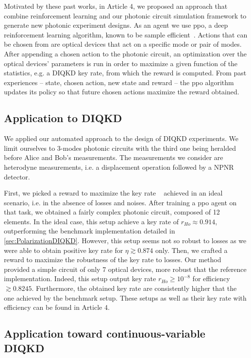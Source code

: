 Motivated by these past works, in Article 4, we proposed an approach that combine reinforcement learning and our photonic circuit simulation framework to generate new photonic experiment designs.
As an agent we use \acrfull{ppo}, a deep reinforcement learning algorithm, known to be sample efficient~\cite{Schulman2017}.
Actions that can be chosen from are optical devices that act on a specific mode or pair of modes.
After appending a chosen action to the photonic circuit, an optimization over the optical devices' parameters is run in order to maximize a given function of the statistics, e.g. a DIQKD key rate, from which the reward is computed.
From past experiences -- state, chosen action, new state and reward -- the \acrshort{ppo} algorithm updates its policy so that future chosen actions maximize the reward obtained.


\subsection{Application to DIQKD}

We applied our automated approach to the design of DIQKD experiments.
We limit ourselves to 3-modes photonic circuits with the third one being heralded before Alice and Bob's measurements.
The measurements we consider are heterodyne measurements, i.e. a displacement operation followed by a NPNR detector.

First, we picked a reward to maximize the key rate ~ achieved in an ideal scenario, i.e. in the absence of losses and noises.
After training a \acrshort{ppo} agent on that task, we obtained a fairly complex photonic circuit, composed of 12 elements.
In the ideal case, this setup achieve a key rate of $r_{Ho}\approx 0.914$, outperforming the benchmark implementation detailed in \ref{sec:PolarizationDIQKD}.
However, this setup seems not so robust to losses as we were able to obtain positive key rate for $\eta \apprge 0.874$ only.
Then, we crafted a reward to maximize the robustness of the key rate to losses.
Our method provided a simple circuit of only 7 optical devices, more robust that the reference implementation.
Indeed, this setup output key rate $r_{Ho}\geq10^{-8}$ for efficiency $\apprge 0.8245$. 
Furthermore, the obtained key rate are consistently higher that the one achieved by the benchmark setup.
These setups as well as their key rate with efficiency can be found in Article 4.


\subsection{Application toward continuous-variable DIQKD}

